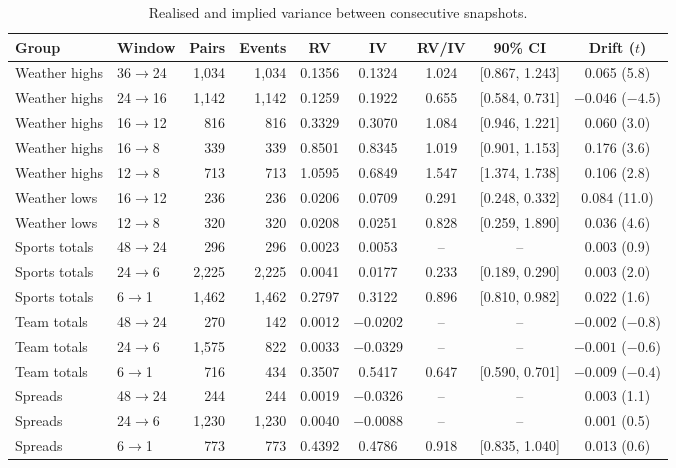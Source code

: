 \begin{table}[ht]
\centering\small
\begin{threeparttable}
\caption{Realised and implied variance between consecutive snapshots.}\label{tab:lad-variance}
\begin{tabular}{@{}llrrccccc@{}}
\toprule
Group & Window & Pairs & Events & RV & IV & RV/IV & 90\% CI & Drift ($t$) \\
\midrule
Weather highs & 36$\to$24 & 1,034 & 1,034 & 0.1356 & 0.1324 & 1.024 & [0.867, 1.243] & 0.065 (5.8) \\
Weather highs & 24$\to$16 & 1,142 & 1,142 & 0.1259 & 0.1922 & 0.655 & [0.584, 0.731] & $-0.046$ ($-4.5$) \\
Weather highs & 16$\to$12 & 816 & 816 & 0.3329 & 0.3070 & 1.084 & [0.946, 1.221] & 0.060 (3.0) \\
Weather highs & 16$\to$8 & 339 & 339 & 0.8501 & 0.8345 & 1.019 & [0.901, 1.153] & 0.176 (3.6) \\
Weather highs & 12$\to$8 & 713 & 713 & 1.0595 & 0.6849 & 1.547 & [1.374, 1.738] & 0.106 (2.8) \\
Weather lows & 16$\to$12 & 236 & 236 & 0.0206 & 0.0709 & 0.291 & [0.248, 0.332] & 0.084 (11.0) \\
Weather lows & 12$\to$8 & 320 & 320 & 0.0208 & 0.0251 & 0.828 & [0.259, 1.890] & 0.036 (4.6) \\
Sports totals & 48$\to$24 & 296 & 296 & 0.0023 & 0.0053 & -- & -- & 0.003 (0.9) \\
Sports totals & 24$\to$6 & 2,225 & 2,225 & 0.0041 & 0.0177 & 0.233 & [0.189, 0.290] & 0.003 (2.0) \\
Sports totals & 6$\to$1 & 1,462 & 1,462 & 0.2797 & 0.3122 & 0.896 & [0.810, 0.982] & 0.022 (1.6) \\
Team totals & 48$\to$24 & 270 & 142 & 0.0012 & $-0.0202$ & -- & -- & $-0.002$ ($-0.8$) \\
Team totals & 24$\to$6 & 1,575 & 822 & 0.0033 & $-0.0329$ & -- & -- & $-0.001$ ($-0.6$) \\
Team totals & 6$\to$1 & 716 & 434 & 0.3507 & 0.5417 & 0.647 & [0.590, 0.701] & $-0.009$ ($-0.4$) \\
Spreads & 48$\to$24 & 244 & 244 & 0.0019 & $-0.0326$ & -- & -- & 0.003 (1.1) \\
Spreads & 24$\to$6 & 1,230 & 1,230 & 0.0040 & $-0.0088$ & -- & -- & 0.001 (0.5) \\
Spreads & 6$\to$1 & 773 & 773 & 0.4392 & 0.4786 & 0.918 & [0.835, 1.040] & 0.013 (0.6) \\

\end{tabular}
\end{threeparttable}
\end{table}
